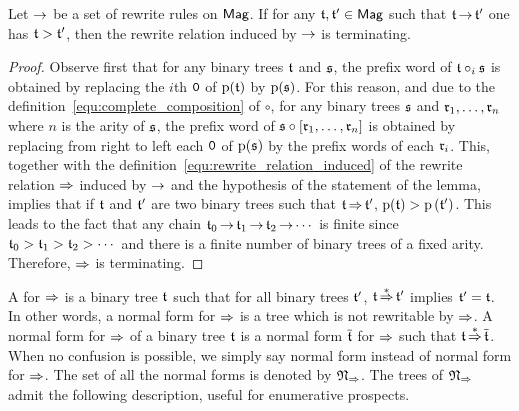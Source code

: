 \begin{Lemma}\label{lem:prefix_word_termination}
    Let $\operatorname{\to}$ be a set of rewrite rules on $\mathsf{Mag}$. If for any
    $\mathfrak{t}, \mathfrak{t}' \in \mathsf{Mag}$ such that $\mathfrak{t} \operatorname{\to} \mathfrak{t}'$ one has
    $\mathfrak{t} > \mathfrak{t}'$, then the rewrite relation induced by $\operatorname{\to}$ is
    terminating.
\end{Lemma}
\begin{proof}
    Observe first that for any binary trees $\mathfrak{t}$ and $\mathfrak{s}$, the
    prefix word of $\mathfrak{t} \circ_i \mathfrak{s}$ is obtained by replacing the
    $i$th $\mathtt{0}$ of $\mathrm{p}(\mathfrak{t})$ by $\mathrm{p}(\mathfrak{s})$. For
    this reason, and due to the
    definition~\eqref{equ:complete_composition} of $\circ$, for any
    binary trees $\mathfrak{s}$ and $\mathfrak{r}_1, \dots, \mathfrak{r}_n$ where $n$ is the
    arity of $\mathfrak{s}$, the prefix word of
    $\mathfrak{s} \circ \left[\mathfrak{r}_1, \dots, \mathfrak{r}_n\right]$ is obtained by
    replacing from right to left each $\mathtt{0}$ of $\mathrm{p}(\mathfrak{s})$ by
    the prefix words of each $\mathfrak{r}_i$. This, together with the
    definition~\eqref{equ:rewrite_relation_induced} of the rewrite
    relation $\operatorname{\Rightarrow}$ induced by $\operatorname{\to}$ and the hypothesis of the
    statement of the lemma, implies that if $\mathfrak{t}$ and $\mathfrak{t}'$ are two
    binary trees such that $\mathfrak{t} \operatorname{\Rightarrow} \mathfrak{t}'$,
    $\mathrm{p}(\mathfrak{t}) > \mathrm{p}\left(\mathfrak{t}'\right)$. This leads to
    the fact that any chain
    \begin{math}
        \mathfrak{t}_0 \operatorname{\to} \mathfrak{t}_1 \operatorname{\to} \mathfrak{t}_2 \operatorname{\to} \cdots
    \end{math}
    is finite since
    \begin{math}
        \mathfrak{t}_0 > \mathfrak{t}_1 > \mathfrak{t}_2 > \cdots
    \end{math}
    and there is a finite number of binary trees of a fixed arity.
    Therefore, $\operatorname{\Rightarrow}$ is terminating.
\end{proof}
\medbreak

A  for $\operatorname{\Rightarrow}$ is a binary tree $\mathfrak{t}$ such
that for all binary trees $\mathfrak{t}'$, $\mathfrak{t} \operatorname{\overset{\ast}{\operatorname{\Rightarrow}}} \mathfrak{t}'$ implies
$\mathfrak{t}' = \mathfrak{t}$. In other words, a normal form for $\operatorname{\Rightarrow}$ is a
tree which is not rewritable by $\operatorname{\Rightarrow}$. A normal form for
$\operatorname{\Rightarrow}$ of a binary tree $\mathfrak{t}$ is a normal form $\overline{\mathfrak{t}}$
for $\operatorname{\Rightarrow}$ such that $\mathfrak{t}\operatorname{\overset{\ast}{\operatorname{\Rightarrow}}}\overline{\mathfrak{t}}$. When no
confusion is possible, we simply say normal form instead of normal form
for $\operatorname{\Rightarrow}$. The set of all the normal forms is denoted by
$\mathfrak{N}_{\operatorname{\Rightarrow}}$. The trees of $\mathfrak{N}_{\operatorname{\Rightarrow}}$
admit the following description, useful for enumerative prospects.
\medbreak

